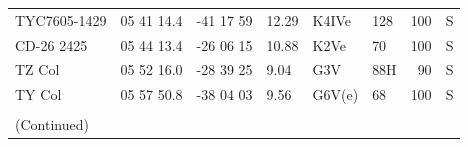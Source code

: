 \documentclass[11pt,twoside]{book}
\begin{document}
\begin{table}[]
{\begin{tabular}{l@{\hskip7pt}ccl
l@{\hskip7pt}lr@{\hskip7pt}l}
TYC7605-1429 &05 41 14.4  &-41 17 59&      12.29         &K4IVe  &128&  100&S\\
CD-26 2425 & 05 44 13.4   &-26 06 15 &      10.88        &K2Ve  &\hspace{2mm}70& 100&S\\
TZ Col   &05 52 16.0      &-28 39 25&      \hspace{2mm}9.04     &G3V  &\hspace{2mm}88H& 90&S\\
TY Col     &05 57 50.8    &-38 04 03&       \hspace{2mm}9.56     &G6V(e)&\hspace{2mm}68&  100&S\\
\\
(Continued)
\end{tabular}
}
\end{table}
\end{document}
